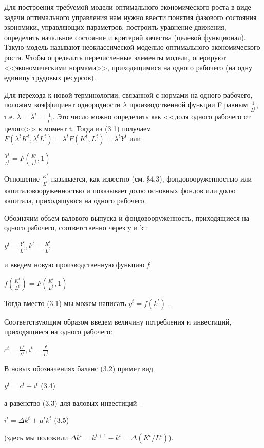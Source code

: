 \documentclass[12pt, 4paper]{book}
\begin{document}
{Для построения требуемой модели оптимального экономического роста в виде задачи оптимального управления нам нужно ввести понятия фазового состояния экономики, управляющих параметров, построить уравнение движения, определить начальное состояние и критерий качества (целевой функционал). Такую модель называют неоклассической моделью оптимального экономического роста. Чтобы определить перечисленные элементы модели, оперируют <<экономическими нормами>>, приходящимися на одного рабочего (на одну единицу трудовых ресурсов).
\par

Для перехода к новой терминологии, связанной с нормами на одного рабочего, положим коэффициент однородности $\lambda$ производственной функции F равным $\frac{1}{L^t}$, т.е. $\lambda = \lambda^t=\frac{1}{L^t}$. Это число можно определить как <<доля одного рабочего от целого>> в момент t. Тогда из (3.1) получаем $F(\lambda^t K^t,\lambda^t L^t)=\lambda^t F(K^t,L^t)=\lambda^t Y^t$ или
\begin{center}
$\frac{Y^t}{L^t} = F(\frac{K^t}{L^t},1)$
\end{center}
\par

Отношение $\frac{K^t}{L^t}$ называется, как известно (см. §4.3), фондовооруженностью или капиталовооруженностью и показывает долю основных фондов или долю капитала, приходящуюся на одного рабочего.
\par

Обозначим объем валового выпуска и фондовооруженность, приходящиеся на одного рабочего, соответственно через y и k :
\begin{center}
$y^t=\frac{Y^t}{L^t}, k^t=\frac{K^t}{L^t}$
\end{center}
и введем новую производственную функцию \textit{f}:
\begin{center}
$f(\frac{K^t}{L^t})=F(\frac{K^t}{L^t},1)$
\end{center}
\par

Тогда вместо (3.1) мы можем написать $y^t=f(k^t)$ .
\par

Соответствующим образом введем величину потребления и инвестиций, приходящиеся на одного рабочего:
\begin{center}
$c^t=\frac{C^t}{L^t}, i^t=\frac{I^t}{L^t}$
\end{center}
\par

В новых обозначениях баланс (3.2) примет вид
\begin{center}
$y^t=c^t+i^t$ (3.4)
\end{center}
а равенство (3.3) для валовых инвестиций -
\begin{center}
$i^t=\Delta k^t + \mu^t k^t$ (3.5)
\end{center}
(здесь мы положили $\Delta k^t = k^{t+1}- k^t=\Delta(K^t/L^t)$).
\par

}
\end{document}
